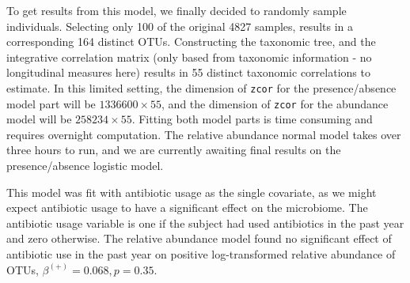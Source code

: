 \documentclass[12pt]{article}
\begin{document}
To get results from this model, we finally decided to randomly sample individuals. Selecting only 100 of the original 4827 samples, results in a corresponding 164 distinct OTUs. Constructing the taxonomic tree, and the integrative correlation matrix (only based from taxonomic information - no longitudinal measures here) results in 55 distinct taxonomic correlations to estimate. In this limited setting, the dimension of \texttt{zcor} for the presence/absence model part will be $1336600 \times 55$, and the dimension of \texttt{zcor} for the abundance model will be $258234 \times 55$. Fitting both model parts is time consuming and requires overnight computation. The relative abundance normal model takes over three hours to run, and we are currently awaiting final results on the presence/absence logistic model.

This model was fit with antibiotic usage as the single covariate, as we might expect antibiotic usage to have a significant effect on the microbiome. The antibiotic usage variable is one if the subject had used antibiotics in the past year and zero otherwise. The relative abundance model found no significant effect of antibiotic use in the past year on positive log-transformed relative abundance of OTUs, $\beta^{(+)} = 0.068, p = 0.35$.


%
\end{document}
